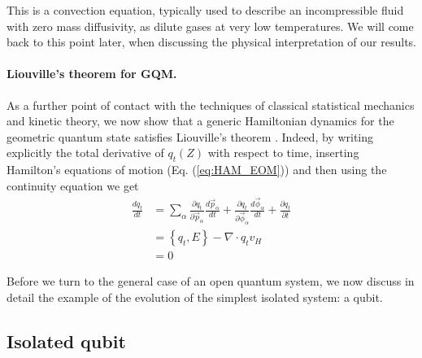 \documentclass[draft,nofootinbib,pre,twocolumn,showpacs,showkeys,preprintnumbers,floatfix]{revtex4-1}
\newcommand{\1}{\mathbbm{1}}
\begin{document}
This is a convection equation, typically used to describe an incompressible fluid with zero mass diffusivity, 
as dilute gases at very low temperatures. We will come back to this point later, when discussing the physical 
interpretation of our results.




\paragraph*{Liouville's theorem for GQM.} As a further point of contact with the techniques of classical 
statistical mechanics and kinetic theory, we now show that a generic Hamiltonian dynamics for the 
geometric quantum state satisfies Liouville's theorem \cite{Soto16}. Indeed, by writing explicitly the total 
derivative of $q_t(Z)$ with respect to time, inserting Hamilton's equations of motion (Eq. (\ref{eq:HAM_EOM})) and then using the continuity equation we get
\begin{align}
\frac{d q_t}{d t} &= \sum_\alpha \frac{\partial q_t}{\partial \vec{p}_\alpha} \frac{d\vec{p}_\alpha}{dt}+\frac{\partial q_t}{\partial \vec{\phi}_\alpha} \frac{d\vec{\phi}_\alpha}{dt} + \frac{\partial q_t}{\partial t} \nonumber\\
& = \left\{ q_t, E\right\} - \nabla \cdot q_t v_H \nonumber \\
& = 0
\end{align}

Before we turn to the general case of an open quantum system, we now discuss in detail the example
of the evolution of the simplest isolated system: a qubit.

\subsection*{Isolated qubit}
\label{sec:EXAMPLES1}
\end{document}
